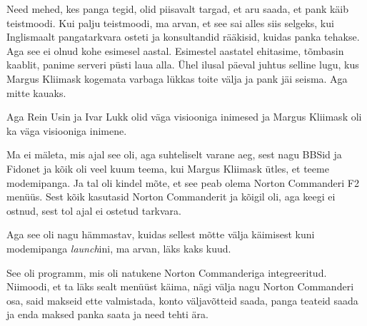 
Need mehed, kes panga tegid, olid piisavalt targad, et aru saada, et pank käib 
teistmoodi. Kui palju teistmoodi, ma arvan, et see sai alles siis selgeks, kui 
Inglismaalt pangatarkvara osteti ja konsultandid rääkisid, kuidas panka 
tehakse. Aga see ei olnud kohe esimesel aastal. Esimestel aastatel ehitasime, 
tõmbasin kaablit, panime serveri püsti laua alla. Ühel ilusal päeval juhtus 
selline lugu, kus Margus Kliimask kogemata varbaga 
lükkas toite välja ja pank jäi seisma. Aga mitte kauaks. 

Aga Rein Usin ja Ivar Lukk olid 
väga visiooniga inimesed ja Margus Kliimask oli ka 
väga visiooniga inimene. 

Ma ei mäleta, mis ajal see oli, aga suhteliselt varane aeg, sest nagu BBSid ja 
Fidonet ja kõik oli veel kuum teema, kui Margus Kliimask ütles, et teeme 
modemipanga. Ja tal oli kindel mõte, et see peab olema Norton 
Commanderi F2 menüüs. Sest kõik kasutasid Norton Commanderit 
ja kõigil oli, aga keegi ei ostnud, sest tol ajal ei ostetud tarkvara. 


Aga see oli nagu hämmastav, kuidas sellest mõtte välja käimisest kuni 
modemipanga \emph{launch}ini, ma arvan, läks kaks kuud.


See  oli programm, mis oli natukene Norton Commanderiga integreeritud. 
Niimoodi, et ta läks sealt menüüst käima, nägi välja nagu Norton Commanderi 
osa, said makseid ette valmistada, konto väljavõtteid saada, panga teateid 
saada ja enda maksed panka saata ja need tehti ära.

